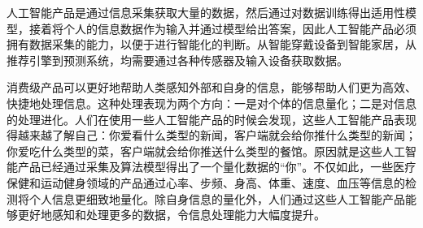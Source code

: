 \documentclass[letterpaper,11pt,english]{sphinxmanual}
\begin{document}
人工智能产品是通过信息采集获取大量的数据，然后通过对数据训练得出适用性模型，接着将个人的信息数据作为输入并通过模型给出答案，因此人工智能产品必须拥有数据采集的能力，以便于进行智能化的判断。从智能穿戴设备到智能家居，从推荐引擎到预测系统，均需要通过各种传感器及输入设备获取数据。

消费级产品可以更好地帮助人类感知外部和自身的信息，能够帮助人们更为高效、快捷地处理信息。这种处理表现为两个方向：一是对个体的信息量化；二是对信息的处理进化。人们在使用一些人工智能产品的时候会发现，这些人工智能产品表现得越来越了解自己：你爱看什么类型的新闻，客户端就会给你推什么类型的新闻；你爱吃什么类型的菜，客户端就会给你推送什么类型的餐馆。原因就是这些人工智能产品已经通过采集及算法模型得出了一个量化数据的“你”。不仅如此，一些医疗保健和运动健身领域的产品通过心率、步频、身高、体重、速度、血压等信息的检测将个人信息更细致地量化。除自身信息的量化外，人们通过这些人工智能产品能够更好地感知和处理更多的数据，令信息处理能力大幅度提升。
\end{document}
